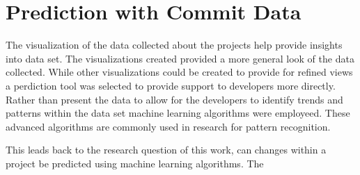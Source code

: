 \chapter{Prediction with Commit Data}
\label{chap:prediction}



The visualization of the data collected about the projects help provide insights into data set. The visualizations created provided a more general look of the data collected. While other visualizations could be created to provide for refined views a perdiction tool was selected to provide support to developers more directly. Rather than present the data to allow for the developers to identify trends and patterns within the data set machine learning algorithms were employeed. These advanced algorithms are commonly used in research for pattern recognition. %

This leads back to the research question of this work, can changes within a project be predicted using machine learning algorithms. The 
